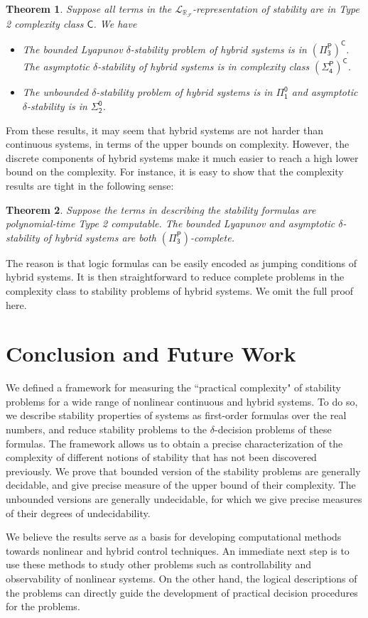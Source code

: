 \documentclass[12pt]{article}
\theoremstyle{plain}
\newtheorem{theorem}{Theorem}[section]
\theoremstyle{definition}
\newcommand{\lrf}{\mathcal{L}_{\mathbb{R}_{\mathcal{F}}}}
\begin{document}
\begin{theorem} Suppose all terms in the $\lrf$-representation of stability are in Type 2 complexity class $\mathsf{C}$. We have
\begin{itemize}
\item The bounded Lyapunov $\delta$-stability problem of hybrid systems is in $\mathsf{(\Pi^P_3)^C}$. The asymptotic $\delta$-stability of hybrid systems is in complexity class $\mathsf{(\Sigma^P_4)^C}$.
\item The unbounded $\delta$-stability problem of hybrid systems is in $\mathsf{\Pi_1^0}$ and asymptotic $\delta$-stability is in $\mathsf{\Sigma_2^0}$.
\end{itemize}
\end{theorem}
From these results, it may seem that hybrid systems are not harder than continuous systems, in terms of the upper bounds on complexity. However, the discrete components of hybrid systems make it much easier to reach a high lower bound on the complexity. For instance, it is easy to show that the complexity results are tight in the following sense:
\begin{theorem}
Suppose the terms in describing the stability formulas are polynomial-time Type 2 computable. The bounded Lyapunov and asymptotic $\delta$-stability of hybrid systems are both $\mathsf{(\Pi^P_3)}$-complete.
\end{theorem}
The reason is that logic formulas can be easily encoded as jumping conditions of hybrid systems. It is then straightforward to reduce complete problems in the complexity class to stability problems of hybrid systems. We omit the full proof here.

\section{Conclusion and Future Work}
We defined a framework for measuring the ``practical complexity" of stability problems for a wide range of nonlinear continuous and hybrid systems. To do so, we describe stability properties of systems as first-order formulas over the real numbers, and reduce stability problems to the $\delta$-decision problems of these formulas. The framework allows us to obtain a precise characterization of the complexity of different notions of stability that has not been discovered previously. We prove that bounded version of the stability problems are generally decidable, and give precise measure of the upper bound of their complexity. The unbounded versions are generally undecidable, for which we give precise measures of their degrees of undecidability.

We believe the results serve as a basis for developing computational methods towards nonlinear and hybrid control techniques. An immediate next step is to use these methods to study other problems such as controllability and observability of nonlinear systems. On the other hand, the logical descriptions of the problems can directly guide the development of practical decision procedures for the problems.



\end{document}
